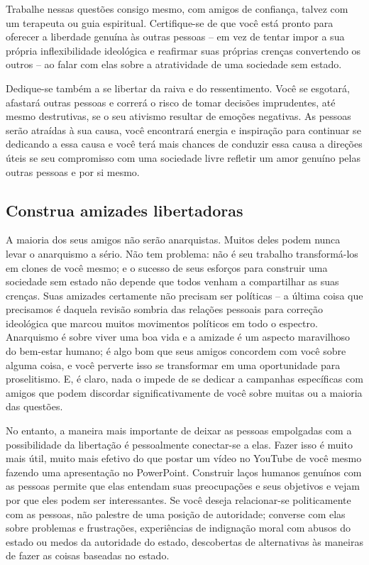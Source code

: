 Trabalhe nessas questões consigo mesmo, com amigos de confiança, talvez com um terapeuta ou guia espiritual. Certifique-se de que você está pronto para oferecer a liberdade genuína às outras pessoas -- em vez de tentar impor a sua própria inflexibilidade ideológica e reafirmar suas próprias crenças convertendo os outros -- ao falar com elas sobre a atratividade de uma sociedade sem estado.

Dedique-se também a se libertar da raiva e do ressentimento. Você se esgotará, afastará outras pessoas e correrá o risco de tomar decisões imprudentes, até mesmo destrutivas, se o seu ativismo resultar de emoções negativas. As pessoas serão atraídas à sua causa, você encontrará energia e inspiração para continuar se dedicando a essa causa e você terá mais chances de conduzir essa causa a direções úteis se seu compromisso com uma sociedade livre refletir um amor genuíno pelas outras pessoas e por si mesmo.

\subsection*{Construa amizades libertadoras}

A maioria dos seus amigos não serão anarquistas. Muitos deles podem nunca levar o anarquismo a sério. Não tem problema: não é seu trabalho transformá-los em clones de você mesmo; e o sucesso de seus esforços para construir uma sociedade sem estado não depende que todos venham a compartilhar as suas crenças. Suas amizades certamente não precisam ser políticas -- a última coisa que precisamos é daquela revisão sombria das relações pessoais para correção ideológica que marcou muitos movimentos políticos em todo o espectro. Anarquismo é sobre viver uma boa vida e a amizade é um aspecto maravilhoso do bem-estar humano; é algo bom que seus amigos concordem com você sobre alguma coisa, e você perverte isso se transformar em uma oportunidade para proselitismo. E, é claro, nada o impede de se dedicar a campanhas específicas com amigos que podem discordar significativamente de você sobre muitas ou a maioria das questões.

No entanto, a maneira mais importante de deixar as pessoas empolgadas com a possibilidade da libertação é pessoalmente conectar-se a elas. Fazer isso é muito mais útil, muito mais efetivo do que postar um vídeo no YouTube de você mesmo fazendo uma apresentação no PowerPoint. Construir laços humanos genuínos com as pessoas permite que elas entendam suas preocupações e seus objetivos e vejam por que eles podem ser interessantes. Se você deseja relacionar-se politicamente com as pessoas, não palestre de uma posição de autoridade; converse com elas sobre problemas e frustrações, experiências de indignação moral com abusos do estado ou medos da autoridade do estado, descobertas de alternativas às maneiras de fazer as coisas baseadas no estado.

